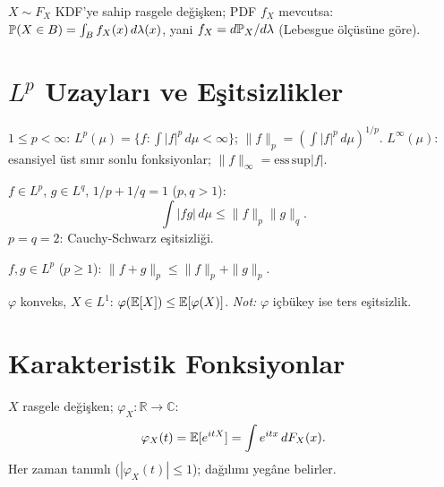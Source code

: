 \begin{ornek}[Yoğunluk = Radon-Nikodym türevi]
$X\sim F_X$ KDF'ye sahip rasgele değişken; PDF $f_X$ mevcutsa: $\mathbb{P}(X\in B)=\int_B f_X(x)\,d\lambda(x)$, yani $f_X = d\mathbb{P}_X/d\lambda$ (Lebesgue ölçüsüne göre).
\end{ornek}

\section{$L^p$ Uzayları ve Eşitsizlikler}
\label{app:lp_uzaylari}

\begin{tanim}[$L^p$ uzayı]\label{app:def:lp}
$1\leq p<\infty$: $L^p(\mu)=\{f:\int|f|^p\,d\mu<\infty\}$; $\|f\|_p=(\int|f|^p\,d\mu)^{1/p}$.
$L^\infty(\mu)$: esansiyel üst sınır sonlu fonksiyonlar; $\|f\|_\infty=\mathrm{ess\,sup}|f|$.
\end{tanim}

\begin{teorem}\label{app:thm:holder}
$f\in L^p$, $g\in L^q$, $1/p+1/q=1$ ($p,q>1$):
\[
  \int|fg|\,d\mu \leq \|f\|_p\|g\|_q.
\]
$p=q=2$: Cauchy-Schwarz eşitsizliği.
\end{teorem}

\begin{teorem}\label{app:thm:minkowski}
$f,g\in L^p$ ($p\geq1$): $\|f+g\|_p \leq \|f\|_p+\|g\|_p$.
\end{teorem}

\begin{teorem}\label{app:thm:jensen}
$\varphi$ konveks, $X\in L^1$: $\varphi(\mathbb{E}[X])\leq\mathbb{E}[\varphi(X)]$.
\textit{Not:} $\varphi$ içbükey ise ters eşitsizlik.
\end{teorem}

\section{Karakteristik Fonksiyonlar}
\label{app:kf_sonuclar}

\begin{tanim}\label{app:def:kf}
$X$ rasgele değişken; $\varphi_X:\mathbb{R}\to\mathbb{C}$:
\[
  \varphi_X(t) = \mathbb{E}[e^{itX}] = \int e^{itx}\,dF_X(x).
\]
Her zaman tanımlı ($|\varphi_X(t)|\leq1$); dağılımı yegâne belirler.
\end{tanim}

